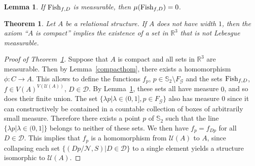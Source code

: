 \documentclass[10pt,a4paper]{amsart}
\newtheorem{thm}{Theorem}
\newtheorem{lem}{Lemma}
\def\fish{\mbox{\rm Fish}}
\begin{document}
\begin{lem}\label{mezero}
If $\fish_{f,D}$ is measurable, then $\mu(\fish_{f,D}) = 0$.
\end{lem}

\begin{thm}\label{main}
Let $A$ be a relational structure. If $A$ does not have width $1$, then the axiom ``$A$ is compact''
implies the existence of a set in $\mathbb{R}^3$
that is not Lebesgue measurable.
\end{thm}

\begin{proof}[Proof of Theorem~\ref{main}] 
Suppose that $A$ is compact and all sets in $\mathbb{R}^3$
are measurable. Then by Lemma~\ref{compacthom},
there exists a homomorphism $\phi: C \rightarrow A$.
This allows to define the functions $f_p$, 
$p \in \mathbb{S}_2\setminus F_\mathcal{G}$
and the sets $\fish_{f,D}$, $f \in V(A)^{V(\mathcal{U}(A))}$, 
$D \in \mathcal{D}$.
By Lemma~\ref{mezero}, these sets all have measure $0$,
and so does their finite union.
The set $\{\lambda p | \lambda \in (0,1], p \in F_{\mathcal{G}}\}$
also has measure $0$ since it can constructively be contained
in a countable collection of boxes of arbitrarily small measure.
Therefore there exists a point $p$ of $\mathbb{S}_2$ 
such that the line $\{\lambda p | \lambda \in (0,1]\}$ 
belongs to neither of these sets.
We then have $f_p = f_{D p}$ for all $D \in \mathcal{D}$. This implies that $f_p$ is a homomorphism
from $\mathcal{U}(A)$ to $A$, since collapsing each set 
$\{ (D p/\mathcal{N},S) | D \in \mathcal{D} \}$ to a single 
element yields a structure isomorphic to $\mathcal{U}(A)$.
\end{proof}
\end{document}
